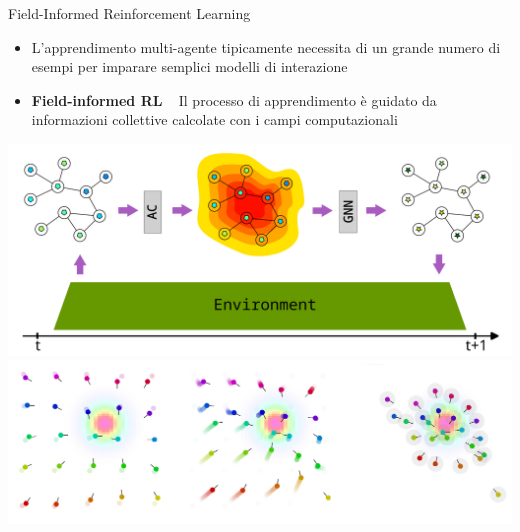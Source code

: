 \documentclass[presentation, 10pt,aspectratio=169]{beamer}\mode<presentation>{\usetheme{AMSBolognaFC}}
\begin{document}
\begin{frame}{Field-Informed Reinforcement Learning}

\begin{minipage}{0.35\textwidth}
	\begin{itemize}
		\item L'apprendimento multi-agente tipicamente necessita di un grande numero di esempi per imparare semplici modelli di interazione
		\item \textbf{Field-informed RL} \faArrowRight ~ Il processo di apprendimento è guidato da informazioni collettive calcolate con i campi computazionali
	\end{itemize}
\end{minipage}
\hfill
\begin{minipage}{0.6\textwidth}
	\centering
	\includegraphics[width=\textwidth]{img/gnn.png}
	\includegraphics[width=\textwidth]{img/gnn-example.png}
\end{minipage}
\end{frame}
\end{document}
